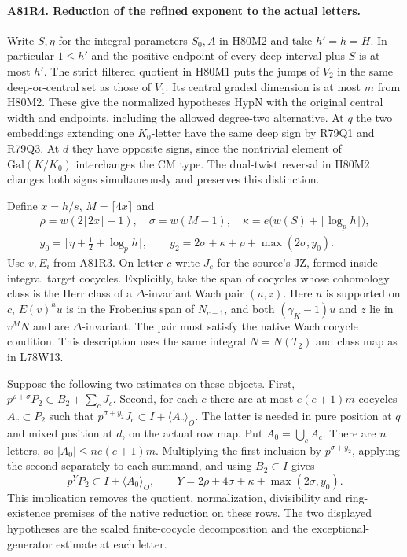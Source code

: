 \paragraph{A81R4. Reduction of the refined exponent to the actual letters.}
Write $S,\eta$ for the integral parameters $S_0,A$ in H80M2 and
take $h'=h=H$. In particular $1\le h'$ and the positive endpoint
of every deep interval plus $S$ is at most $h'$. The strict
filtered quotient in H80M1 puts the jumps of $V_2$ in the same
deep-or-central set as those of $V_1$. Its central graded dimension
is at most $m$ from H80M2. These give the normalized hypotheses
$\mathrm{HypN}$ with the original central width and endpoints,
including the allowed degree-two alternative. At $q$ the two
embeddings extending one $K_0$-letter have the same deep sign by
R79Q1 and R79Q3. At $d$ they have opposite signs, since the
nontrivial element of $\mathrm{Gal}(K/K_0)$ interchanges the
CM type. The dual-twist reversal in H80M2 changes both signs
simultaneously and preserves this distinction.

Define $x=h/s$, $M=\lceil4x\rceil$ and
\[
\begin{gathered}
 \rho=w(2\lceil2x\rceil-1),\quad
 \sigma=w(M-1),\quad
 \kappa=e\big(w(S)+\lfloor\log_p h\rfloor\big),\\
 y_0=\lceil\eta+\tfrac12+\log_p h\rceil,
 \qquad y_2=2\sigma+\kappa+\rho+\max(2\sigma,y_0).
\end{gathered}
\]
Use $v,E_i$ from A81R3. On letter $c$ write $J_c$ for the
source's $\mathrm{JZ}$, formed inside integral target cocycles.
Explicitly, take the span of cocycles whose cohomology class is
the Herr class of a $\Delta$-invariant Wach pair $(u,z)$.
Here $u$ is supported on $c$, $E(v)^h u$ is in the Frobenius
span of $N_{c-1}$, and both $(\gamma_K-1)u$ and $z$ lie in
$v^MN$ and are $\Delta$-invariant. The pair must satisfy the
native Wach cocycle condition. This description uses the same
integral $N=N(T_2)$ and class map as in L78W13.

Suppose the following two estimates on these objects.
First, $p^{\rho+\sigma}P_2\subset B_2+\sum_cJ_c$.
Second, for each $c$ there are at most $e(e+1)m$ cocycles
$A_c\subset P_2$ such that
$p^{\sigma+y_2}J_c\subset I+\langle A_c\rangle_O$.
The latter is needed in pure position at $q$ and mixed position
at $d$, on the actual row map. Put $A_0=\bigcup_cA_c$.
There are $n$ letters, so $|A_0|\le ne(e+1)m$.
Multiplying the first inclusion by $p^{\sigma+y_2}$, applying
the second separately to each summand, and using $B_2\subset I$
gives
\[
 p^Y P_2\subset I+\langle A_0\rangle_O,\qquad
 Y=2\rho+4\sigma+\kappa+\max(2\sigma,y_0).
\]
This implication removes the quotient, normalization, divisibility
and ring-existence premises of the native reduction on these rows.
The two displayed hypotheses are the scaled finite-cocycle
decomposition and the exceptional-generator estimate at each letter.

